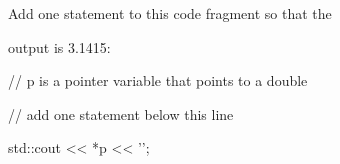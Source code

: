 Add one statement to this code fragment so that the

output is 3.1415:

\begin{consolethree}[escapeinside=||]

// p is a pointer variable that points to a double



// add one statement below this line







std::cout << *p << '\n';

\end{consolethree}

